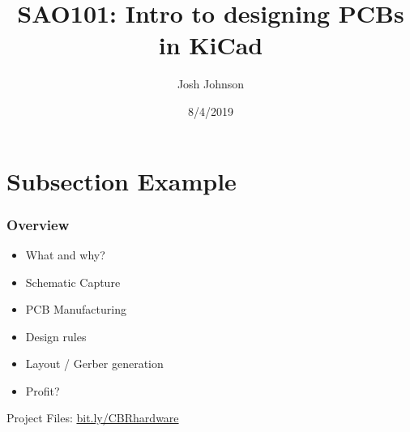 \documentclass[t]{beamer}
\title[SAO101]{SAO101: Intro to designing PCBs in KiCad} %
\author{Josh Johnson} %
\institute[] %
{ \\ %
\medskip
\textit{} %
}
\date{8/4/2019} %
\begin{document}
\begin{frame}
\titlepage %
\end{frame}


\section{Subsection Example} %

\begin{frame}
\frametitle{Overview}
\begin{itemize}
\item What and why?
\item Schematic Capture
\item PCB Manufacturing
\item Design rules
\item Layout / Gerber generation
\item Profit?
\end{itemize}
\vspace{35mm}
Project Files: \url{bit.ly/CBRhardware}\\
\end{frame}

\end{document}
